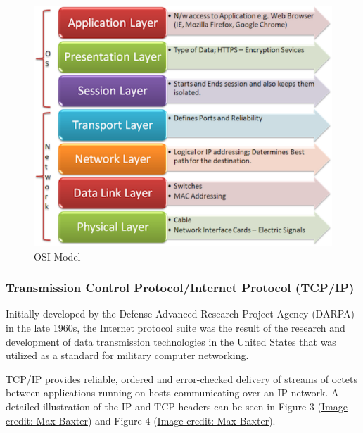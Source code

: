 \documentclass[11pt,a4paper]{article}
\begin{document}
\begin{figure}[h]

{\centering \includegraphics{thesis_files/figure-latex/unnamed-chunk-5-1} 

}

\caption{OSI Model}\label{fig:unnamed-chunk-5}
\end{figure}

\subsubsection{Transmission Control Protocol/Internet Protocol
(TCP/IP)}\label{transmission-control-protocolinternet-protocol-tcpip}

Initially developed by the Defense Advanced Research Project Agency
(DARPA) in the late 1960s, the Internet protocol suite was the result of
the research and development of data transmission technologies in the
United States that was utilized as a standard for military computer
networking.

TCP/IP provides reliable, ordered and error-checked delivery of streams
of octets between applications running on hosts communicating over an IP
network. A detailed illustration of the IP and TCP headers can be seen
in Figure 3
(\href{http://nmap.org/book/images/hdr/MJB-TCP-Header}{Image credit: Max
Baxter}) and Figure 4
(\href{http://nmap.org/book/images/hdr/MJB-IP-Header}{Image credit: Max
Baxter}).
\end{document}
